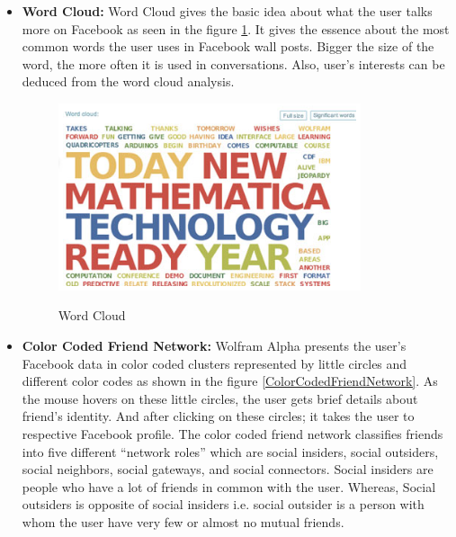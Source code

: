 \documentclass[12pt]{ucthesis}
\newcommand{\captionfonts}{\small\bf\ssp}
\begin{document}
\begin{itemize}
\item \textbf{Word Cloud:}
	Word Cloud gives the basic idea about what the user talks more on Facebook as seen in the figure \ref{WordCloud}. It gives the essence about the most common words the user uses in Facebook wall posts. Bigger the size of the word, the more often it is used in conversations. Also, user's interests can be deduced from the word cloud analysis.
 \begin{figure}[!htb]
   	\centering
    \includegraphics[height=55mm]{WolframWordCloud.PNG}
    \captionfonts
    \caption[Word Cloud]{Word Cloud}
    \label{WordCloud}
  \end{figure}

\item \textbf{Color Coded Friend Network:}
	Wolfram Alpha presents the user's Facebook data in color coded clusters represented by little circles and different color codes as shown in the figure \ref{ColorCodedFriendNetwork}. As the mouse hovers on these little circles, the user gets brief details about friend's identity. And after clicking on these circles; it takes the user to respective Facebook profile. The color coded friend network classifies friends into five different ``network roles'' which are social insiders, social outsiders, social neighbors, social gateways, and social connectors. Social insiders are people who have a lot of friends in common with the user. Whereas, Social outsiders is opposite of social insiders i.e. social outsider is a person with whom the user have very few or almost no mutual friends.
 

\end{itemize}
\end{document}
